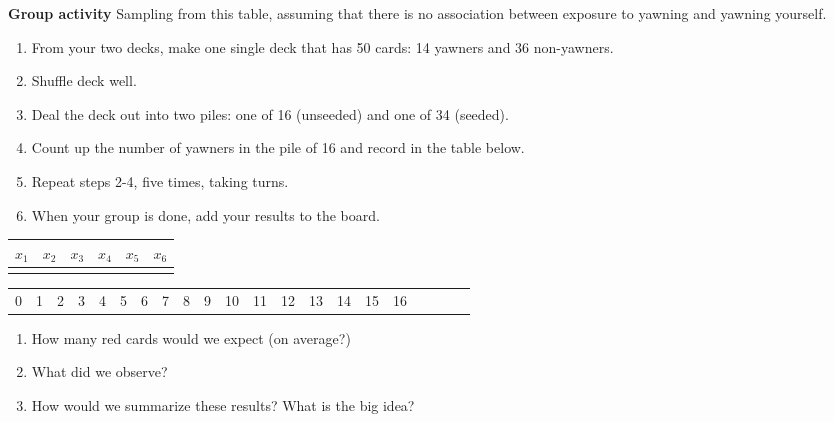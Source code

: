\documentclass[10pt]{article}\usepackage[]{graphicx}\usepackage[]{color}
\newcommand{\ans}{\vspace{0.25in}}
\begin{document}
\newpage

\textbf{Group activity} Sampling from this table, assuming that there is no association between exposure to yawning and yawning yourself.  
\begin{enumerate}
  \item From your two decks, make one single deck that has 50 cards: 14 yawners and 36 non-yawners.  
  \item Shuffle deck well.
  \item Deal the deck out into two piles: one of 16 (unseeded) and one of 34 (seeded).
  \item Count up the number of yawners in the pile of 16 and record in the table below.
  \item Repeat steps 2-4, five times, taking turns.
  \item When your group is done, add your results to the board.
\end{enumerate}

\begin{center}
\begin{tabular}{|c|c|c|c|c|c|}
  \hline
  $x_1$ & $x_2$ & $x_3$ & $x_4$ & $x_5$ & $x_6$ \\
  \hline
  \hspace{0.75in} & \hspace{0.75in} & \hspace{0.75in} & \hspace{0.75in} & \hspace{0.75in} & \hspace{0.75in} \\[5ex]
  \hline
\end{tabular}
\end{center}

\vspace{2in}

\begin{center}
\begin{tabular}{|c|c|c|c|c|c|c|c|c|c|c|c|c|c|c|c|c|c|c|c|c|}
  \hline
  0 & 1 & 2 & 3 & 4 & 5 & 6 & 7 & 8 & 9 & 10 & 11 & 12 & 13 & 14 & 15 & 16 \\
\end{tabular}
\end{center}

\vspace{15mm}

\begin{enumerate}
  \item How many red cards would we expect (on average?)
  \ans
  \item What did we observe?
  \ans
  \item How would we summarize these results?   What is the big idea?
  \ans
\end{enumerate}
\end{document}
